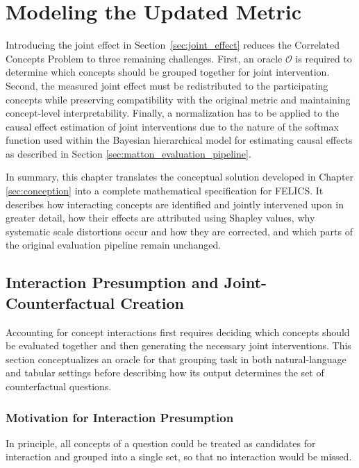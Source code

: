 \chapter{Modeling the Updated Metric}
\label{sec:modeling_updated_metric}
Introducing the joint effect in Section~\ref{sec:joint_effect} reduces the Correlated Concepts Problem to three remaining challenges. First, an oracle $\mathcal{O}$ is required to determine which concepts should be grouped together for joint intervention. Second, the measured joint effect must be redistributed to the participating concepts while preserving compatibility with the original metric and maintaining concept-level interpretability. Finally, a normalization has to be applied to the causal effect estimation of joint interventions due to the nature of the softmax function used within the Bayesian hierarchical model for estimating causal effects as described in Section \ref{sec:matton_evaluation_pipeline}.

In summary, this chapter translates the conceptual solution developed in Chapter \ref{sec:conception} into a complete mathematical specification for FELICS. It describes how interacting concepts are identified and jointly intervened upon in greater detail, how their effects are attributed using Shapley values, why systematic scale distortions occur and how they are corrected, and which parts of the original evaluation pipeline remain unchanged.

\section{Interaction Presumption and Joint-Counterfactual Creation}
\label{sec:joint_counterfactual}
Accounting for concept interactions first requires deciding which concepts should be evaluated together and then generating the necessary joint interventions. This section conceptualizes an oracle for that grouping task in both natural-language and tabular settings before describing how its output determines the set of counterfactual questions.

\subsection{Motivation for Interaction Presumption}
\label{sec:correlation_identification_motivation}
In principle, all concepts of a question could be treated as candidates for interaction and grouped into a single set, so that no interaction would be missed.


